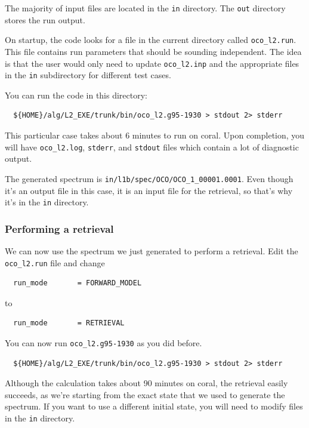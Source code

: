 \documentclass{article}
\begin{document}
The majority of input files are located in the \texttt{in} directory.
The \texttt{out} directory stores the run output.  

On startup, the code looks for a file in the current directory called
\texttt{oco\_l2.run}.  This file contains run parameters that should be
sounding independent.  The idea is that the user would only need to
update \texttt{oco\_l2.inp} and the appropriate files in the \texttt{in}
subdirectory for different test cases.

You can run the code in this directory:

\begin{verbatim}
  ${HOME}/alg/L2_EXE/trunk/bin/oco_l2.g95-1930 > stdout 2> stderr
\end{verbatim} %

This particular case takes about 6 minutes to run on coral.  Upon
completion, you will have \texttt{oco\_l2.log}, \texttt{stderr}, and
\texttt{stdout} files which contain a lot of diagnostic output.

The generated spectrum is \texttt{in/l1b/spec/OCO/OCO\_1\_00001.0001}.  Even
though it's an output file in this case, it is an input file for the
retrieval, so that's why it's in the \texttt{in} directory.

\subsubsection{Performing a retrieval}

We can now use the spectrum we just generated to perform a retrieval.
Edit the \texttt{oco\_l2.run} file and change 
\begin{verbatim}
  run_mode       = FORWARD_MODEL
\end{verbatim}
to
\begin{verbatim}
  run_mode       = RETRIEVAL
\end{verbatim}

You can now run \texttt{oco\_l2.g95-1930} as you did before.  

\begin{verbatim}
  ${HOME}/alg/L2_EXE/trunk/bin/oco_l2.g95-1930 > stdout 2> stderr
\end{verbatim} %

Although the calculation takes about 90 minutes on coral, the
retrieval easily succeeds, as we're starting from the exact state that
we used to generate the spectrum.  If you want to use a different
initial state, you will need to modify files in the \texttt{in}
directory.
\end{document}
